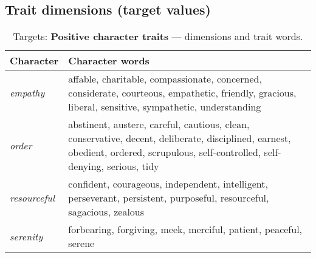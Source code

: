 \newpage
\subsection{Trait dimensions (target values)} \label{target-values}

{
\renewcommand{\arraystretch}{1.5}
\begin{table}[H]
    \vspace{-3mm}
    \small
    \centering
    \begin{tabular}{|p{1.5cm}|p{5.7cm}|@{}}
            \hline
        \textbf{Character} & \textbf{Character words }                        \\
        \hline
        \textit{empathy} & affable, charitable, compassionate, concerned, considerate, courteous, empathetic, friendly, gracious, liberal, sensitive, sympathetic, understanding                            \\
        \hline
        \textit{order} & abstinent, austere, careful, cautious, clean, conservative, decent, deliberate, disciplined, earnest, obedient, ordered, scrupulous, self-controlled, self-denying, serious, tidy \\
        \hline
        \textit{resourceful} & confident, courageous, independent, intelligent, perseverant, persistent, purposeful, resourceful, sagacious, zealous                                                            \\
        \hline
        \textit{serenity} & forbearing, forgiving, meek, merciful, patient, peaceful, serene    \\                                         \hline                                        
    \end{tabular}
    \captionsetup{justification=centering}
    \caption{Targets: \textbf{Positive character traits} --- dimensions and trait words.}
    \label{tab:targets_virtue}
\end{table}
}

